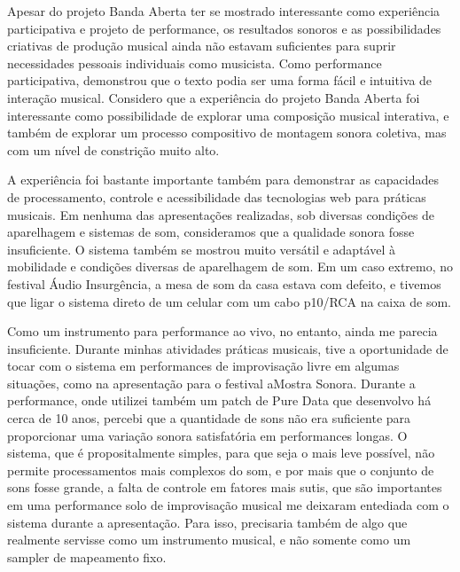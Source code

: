 
Apesar do projeto Banda Aberta ter se mostrado interessante como experiência participativa e projeto de performance, os resultados sonoros e as possibilidades criativas de produção musical ainda não estavam suficientes para suprir necessidades pessoais individuais como musicista. Como performance participativa, demonstrou que o texto podia ser uma forma fácil e intuitiva de interação musical. Considero que a experiência do projeto Banda Aberta foi interessante como possibilidade de explorar uma composição musical interativa, e também de explorar um processo compositivo de montagem sonora coletiva, mas com um nível de constrição muito alto. 

A experiência foi bastante importante também para demonstrar as capacidades de processamento, controle e acessibilidade das tecnologias web para práticas musicais. Em nenhuma das apresentações realizadas, sob diversas condições de aparelhagem e sistemas de som, consideramos que a qualidade sonora fosse insuficiente. O sistema também se mostrou muito versátil e adaptável à mobilidade e condições diversas de aparelhagem de som. Em um caso extremo, no festival Áudio Insurgência, a mesa de som da casa estava com defeito, e tivemos que ligar o sistema direto de um celular com um cabo p10/RCA na caixa de som.

Como um instrumento para performance ao vivo, no entanto, ainda me parecia insuficiente. Durante minhas atividades práticas musicais, tive a oportunidade de tocar com o sistema em performances de improvisação livre em algumas situações, como na apresentação para o festival aMostra Sonora. Durante a performance, onde utilizei também um patch de Pure Data que desenvolvo há cerca de 10 anos, percebi que a quantidade de sons não era suficiente para proporcionar uma variação sonora satisfatória em performances longas. O sistema, que é propositalmente simples, para que seja o mais leve possível, não permite processamentos mais complexos do som, e por mais que o conjunto de sons fosse grande, a falta de controle em fatores mais sutis, que são importantes em uma performance solo de improvisação musical me deixaram entediada com o sistema durante a apresentação. Para isso, precisaria também de algo que realmente servisse como um instrumento musical, e não somente como um sampler de mapeamento fixo. 

